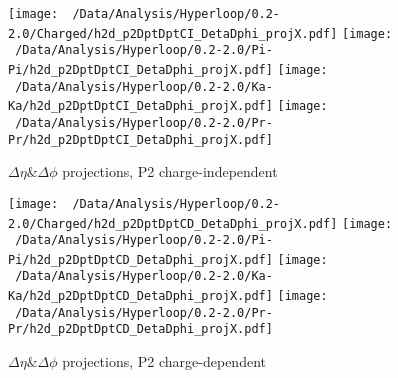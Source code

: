 \documentclass[ALICE,manyauthors]{ALICE_analysis_notes}
\begin{document}
\begin{figure}[H]
	\hfill
	\centering
	\texttt{[image: ~/Data/Analysis/Hyperloop/0.2-2.0/Charged/h2d\_p2DptDptCI\_DetaDphi\_projX.pdf]}
	\texttt{[image: ~/Data/Analysis/Hyperloop/0.2-2.0/Pi-Pi/h2d\_p2DptDptCI\_DetaDphi\_projX.pdf]}
	\texttt{[image: ~/Data/Analysis/Hyperloop/0.2-2.0/Ka-Ka/h2d\_p2DptDptCI\_DetaDphi\_projX.pdf]}
	\texttt{[image: ~/Data/Analysis/Hyperloop/0.2-2.0/Pr-Pr/h2d\_p2DptDptCI\_DetaDphi\_projX.pdf]}
	\\
	\hfill
	\centering
	\caption{$\Delta\eta\&\Delta\phi$ projections, P2 charge-independent}
\end{figure}
\begin{figure}[H]
	\hfill
	\centering
	\texttt{[image: ~/Data/Analysis/Hyperloop/0.2-2.0/Charged/h2d\_p2DptDptCD\_DetaDphi\_projX.pdf]}
	\texttt{[image: ~/Data/Analysis/Hyperloop/0.2-2.0/Pi-Pi/h2d\_p2DptDptCD\_DetaDphi\_projX.pdf]}
	\texttt{[image: ~/Data/Analysis/Hyperloop/0.2-2.0/Ka-Ka/h2d\_p2DptDptCD\_DetaDphi\_projX.pdf]}
	\texttt{[image: ~/Data/Analysis/Hyperloop/0.2-2.0/Pr-Pr/h2d\_p2DptDptCD\_DetaDphi\_projX.pdf]}
	\\
	\hfill
	\centering
	\caption{$\Delta\eta\&\Delta\phi$ projections, P2 charge-dependent}
\end{figure}
\end{document}
